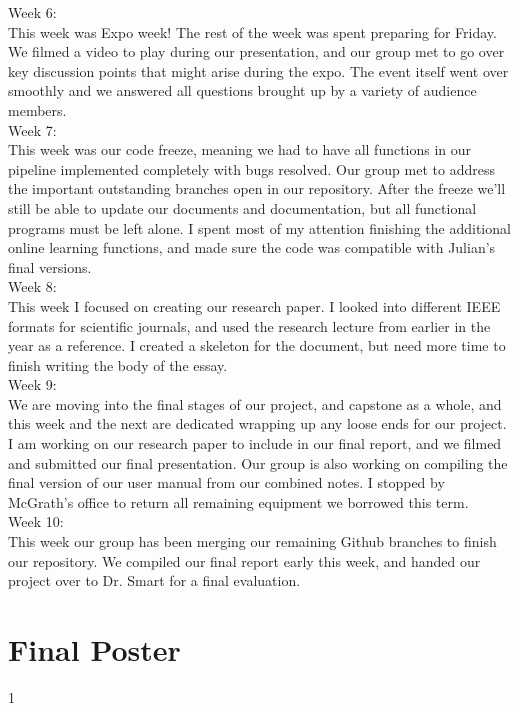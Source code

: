 \documentclass[draftclsnofoot, onecolumn, 10pt, compsoc]{IEEEtran}
\begin{document}
    	Week 6: \\ \indent This week was Expo week! The rest of the week was spent preparing for Friday. We filmed a video to play during our presentation, and our group met to go over key discussion points that might arise during the expo. The event itself went over smoothly and we answered all questions brought up by a variety of audience members. \\
    	Week 7: \\ \indent This week was our code freeze, meaning we had to have all functions in our pipeline implemented completely with bugs resolved. Our group met to address the important outstanding branches open in our repository. After the freeze we'll still be able to update our documents and documentation, but all functional programs must be left alone. I spent most of my attention finishing the additional online learning functions, and made sure the code was compatible with Julian's final versions. \\
    	Week 8: \\ \indent This week I focused on creating our research paper. I looked into different IEEE formats for scientific journals, and used the research lecture from earlier in the year as a reference. I created a skeleton for the document, but need more time to finish writing the body of the essay. \\
    	Week 9: \\ \indent We are moving into the final stages of our project, and capstone as a whole, and this week and the next are dedicated wrapping up any loose ends for our project. I am working on our research paper to include in our final report, and we filmed and submitted our final presentation. Our group is also working on compiling the final version of our user manual from our combined notes. I stopped by McGrath's office to return all remaining equipment we borrowed this term. \\
    	Week 10: \\ \indent This week our group has been merging our remaining Github branches to finish our repository. We compiled our final report early this week, and handed our project over to Dr. Smart for a final evaluation. \\




\newpage

\section{Final Poster}
	1 \newpage
    
\end{document}
